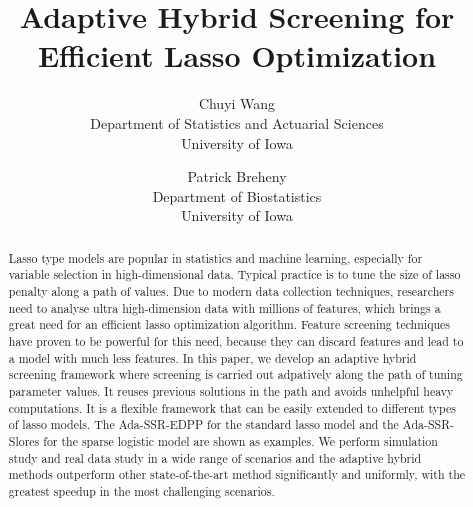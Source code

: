\documentclass{article}
\title{Adaptive Hybrid Screening for Efficient Lasso Optimization}
\author{Chuyi Wang\\Department of Statistics and Actuarial Sciences\\University of Iowa
  \and
  Patrick Breheny\\Department of Biostatistics\\University of Iowa}
\date{}
\begin{document}
\maketitle

\begin{abstract}
Lasso type models are popular in statistics and machine learning, especially for variable selection in high-dimensional data. Typical practice is to tune the size of lasso penalty along a path of values. Due to modern data collection techniques, researchers need to analyse ultra high-dimension data with millions of features, which brings a great need for an efficient lasso optimization algorithm. Feature screening techniques have proven to be powerful for this need, because they can discard features and lead to a model with much less features. In this paper, we develop an adaptive hybrid screening framework where screening is carried out adpatively along the path of tuning parameter values. It reuses previous solutions in the path and avoids unhelpful heavy computations. It is a flexible framework that can be easily extended to different types of lasso models. The Ada-SSR-EDPP for the standard lasso model and the Ada-SSR-Slores for the sparse logistic model are shown as examples. We perform simulation study and real data study in a wide range of scenarios and the adaptive hybrid methods outperform other state-of-the-art method significantly and uniformly, with the greatest speedup in the most challenging scenarios.
\end{abstract}




\end{document}
